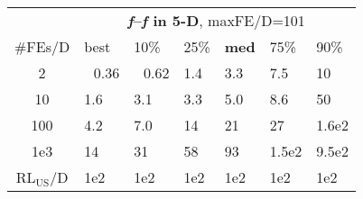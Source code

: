 \begin{tabular}{c|llllll}
 & \multicolumn{6}{|c}{\textbf{\textit{f}\raisebox{-0.35ex}{1}--\textit{f}\raisebox{-0.35ex}{24} in 5-D}, maxFE/D=101}\\
\#FEs/D & best & 10\% & 25\% & \textbf{med} & 75\% & 90\%\\
2 & ~\,0.36 & ~\,0.62 & \hspace*{1ex}1.4 & \hspace*{1ex}3.3 & \hspace*{1ex}7.5 & 10\\
10 & \hspace*{1ex}1.6 & \hspace*{1ex}3.1 & \hspace*{1ex}3.3 & \hspace*{1ex}5.0 & \hspace*{1ex}8.6 & 50\\
100 & \hspace*{1ex}4.2 & \hspace*{1ex}7.0 & 14 & 21 & 27 & 1.6e2\\
1e3 & 14 & 31 & 58 & 93 & 1.5e2 & 9.5e2\\
$\text{RL}_{\text{US}}$/D & 1e2 & 1e2 & 1e2 & 1e2 & 1e2 & 1e2
\end{tabular}
